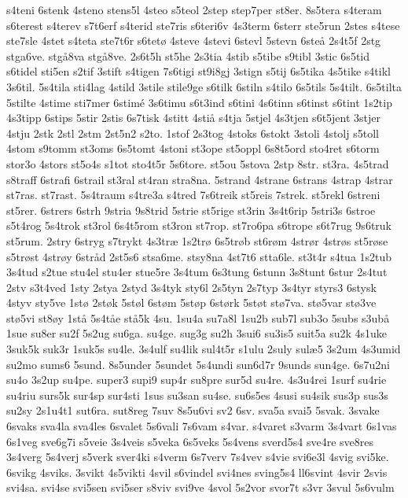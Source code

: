 {s4teni
6stenk
4steno
stens5l
4steo
s5teol
2step
step7per
st8er.
8s5tera
s4teram
s6terest
s4terev
s7t6erf
s4terid
ste7ris
s6teri6v
4s3term
6sterr
ste5run
2stes
s4tese
ste7sle
4stet
s4teta
ste7t6r
s6tetø
4steve
4stevi
6stevl
5stevn
6steå
2s4t5f
2stg
stga6ve.
stgå8va
stgå8ve.
2s6t5h
st5he
2s3tia
4stib
s5tibe
s9tibl
3stic
6s5tid
s6tidel
sti5en
s2tif
3stift
s4tigen
7s6tigi
st9i8gj
3stign
s5tij
6s5tika
4s5tike
s4tikl
3s6til.
5s4tila
sti4lag
4stild
3stile
stile9ge
s6tilk
6stiln
s4tilo
6s5tils
5s4tilt.
6s5tilta
5stilte
4stime
sti7mer
6stimé
3s6timu
s6t3ind
s6tini
4s6tinn
s6tinst
s6tint
1s2tip
4s3tipp
6stips
5stir
2stis
6s7tisk
4stitt
4stiå
s4tja
5stjel
4s3tjen
s6t5jent
3stjer
4stju
2stk
2stl
2stm
2st5n2
s2to.
1stof
2s3tog
4stoks
6stokt
3stoli
4stolj
s5toll
4stom
s9tomm
st3oms
6s5tomt
4stoni
st3ope
st5oppl
6s8t5ord
sto4ret
s6torm
stor3o
4stors
st5o4s
s1tot
sto4t5r
5s6tore.
st5ou
5stova
2stp
8str.
st3ra.
4s5trad
s8traff
6strafi
6strail
st3ral
st4ran
stra8na.
5strand
4strane
6strans
4strap
4strar
st7ras.
st7rast.
5s4traum
s4tre3a
s4tred
7s6treik
st5reis
7strek.
st5rekl
6streni
st5rer.
6strers
6strh
9stria
9s8trid
5strie
st5rige
st3rin
3s4t6rip
5stri3s
6stroe
s5t4rog
5s4trok
st3rol
6s4t5rom
st3ron
st7rop.
st7ro6pa
s6trope
s6t7rug
9s6truk
st5rum.
2stry
6stryg
s7trykt
4s3træ
1s2trø
6s5trøb
st6røm
4strør
4strøs
st5røse
s5trøst
4strøy
6stråd
2st5s6
stsa6me.
stsy8na
4st7t6
stta6le.
st3t4r
s4tua
1s2tub
3s4tud
s2tue
stu4el
stu4er
stue5re
3s4tum
6s3tung
6stunn
3s8tunt
6stur
2s4tut
2stv
s3t4ved
1sty
2stya
2styd
3s4tyk
sty6l
2s5tyn
2s7typ
3s4tyr
styrs3
6stysk
4styv
sty5ve
1stø
2støk
5støl
6støm
5støp
6størk
5støt
stø7va.
stø5var
stø3ve
stø5vi
st8øy
1stå
5s4tåe
stå5k
4su.
1su4a
su7a8l
1su2b
sub7l
sub3o
5subs
s3ubå
1sue
su8er
su2f
5s2ug
su6ga.
su4ge.
sug3g
su2h
3sui6
su3is5
suit5a
su2k
4s1uke
3suk5k
suk3r
1suk5s
su4le.
3s4ulf
su4lik
sul4t5r
s1ulu
2suly
sulæ5
3s2um
4s3umid
su2mo
sums6
5sund.
8s5under
5sundet
5s4undi
sun6d7r
9sunds
sun4ge.
6s7u2ni
su4o
3s2up
su4pe.
super3
supi9
sup4r
su8pre
sur5d
su4re.
4s3u4rei
1surf
su4rie
su4riu
surs5k
sur4sp
sur4sti
1sus
su3san
su4se.
su6s5es
4susi
su4sik
sus3p
sus3s
su2sy
2s1u4t1
sut6ra.
sut8reg
7suv
8s5u6vi
sv2
6sv.
sva5a
svai5
5svak.
3svake
6svaks
sva4la
sva4les
6svalet
5s6vali
7s6vam
s4var.
s4varet
s3varm
3s4vart
6s1vas
6s1veg
sve6g7i
s5veie
3s4veis
s5veka
6s5veks
5s4vens
sverd5s4
sve4re
sve8res
3s4verg
5s4verj
s5verk
sver4ki
s4verm
6s7verv
7s4vev
s4vie
svi6e3l
4svig
svi5ke.
6svikg
4sviks.
3svikt
4s5vikti
4svil
s6vindel
svi4nes
sving5s4
ll6svint
4svir
2svis
svi4sa.
svi4se
svi5sen
svi5ser
s8viv
svi9ve
4svol
5s2vor
svor7t
s3vr
3svul
5s6vulm
}
